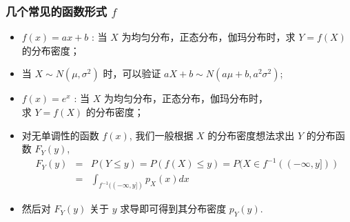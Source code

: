 \documentclass[Prob-All.tex]{subfiles}
\begin{document}
 \begin{frame}
 	\frametitle{几个常见的函数形式 $f$}
 	\begin{itemize}[<+-|alert@+>]
 		\item $f (x)=ax+b$ : 当 $X$ 为均匀分布，正态分布，伽玛分布时，求 $Y=f (X)$ 的分布密度；
 		\item 当 $X\sim N (\mu,\sigma^2)$ 时，可以验证 $aX+b\sim N (a\mu+b, a^2\sigma^2)$;
 		\item $f (x)=e^x$ : 当 $X$ 为均匀分布，正态分布，伽玛分布时，\\ 求 $Y=f (X)$ 的分布密度；
 		\item 对无单调性的函数 $f (x)$, 我们一般根据 $X$ 的分布密度想法求出 $Y$ 的分布函数 $F_Y (y)$,
 		\begin{eqnarray*}
 			F_Y(y)&=&P(Y\le y)=P(f(X)\le y)=P(X\in f^{-1}((-\infty, y]))\\
 			&=&\int_{f^{-1}((-\infty, y])}p_X(x)dx
 		\end{eqnarray*}
 		\item 然后对 $F_Y (y)$ 关于 $y$ 求导即可得到其分布密度 $p_Y (y)$.
 	\end{itemize}

 \end{frame}
\end{document}
